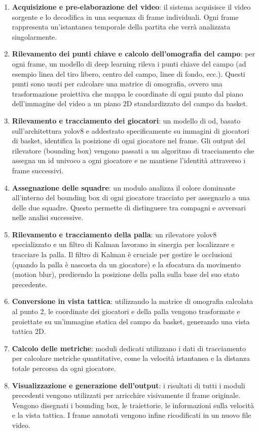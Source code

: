 \documentclass[12pt,a4paper,openright,twoside]{book}
\begin{document}
\begin{enumerate}
  \item \textbf{Acquisizione e pre-elaborazione del video}: il 
  sistema acquisisce il video sorgente e lo decodifica in una 
  sequenza di frame individuali. Ogni frame rappresenta 
  un'istantanea temporale della partita che verrà analizzata 
  singolarmente.
  \item \textbf{Rilevamento dei punti chiave e calcolo dell'omografia del campo}: 
  per ogni frame, un modello di deep learning rileva i punti 
  chiave del campo (ad esempio linea del tiro libero, centro 
  del campo, linee di fondo, ecc.). Questi punti sono usati 
  per calcolare una matrice di omografia, ovvero una 
  trasformazione proiettiva che mappa le coordinate di ogni 
  punto dal piano dell'immagine del video a un piano 2D 
  standardizzato del campo da basket.
  \item \textbf{Rilevamento e tracciamento dei giocatori}: 
  un modello di \ac{od}, basato sull'architettura 
  \ac{yolo}v8 e addestrato specificamente su immagini 
  di giocatori di basket, identifica la posizione di 
  ogni giocatore nel frame. Gli output del rilevatore 
  (bounding box) vengono passati a un algoritmo di 
  tracciamento che assegna un \ac{id} univoco a ogni 
  giocatore e ne mantiene l'identità attraverso i 
  frame successivi.
  \item \textbf{Assegnazione delle squadre}: un modulo analizza 
  il colore dominante all'interno del bounding box di ogni 
  giocatore tracciato per assegnarlo a una delle due squadre. 
  Questo permette di distinguere tra compagni e avversari 
  nelle analisi successive.
  \item \textbf{Rilevamento e tracciamento della palla}: un 
  rilevatore \ac{yolo}v8 specializzato e un filtro di Kalman 
  lavorano in sinergia per localizzare e tracciare la palla. 
  Il filtro di Kalman è cruciale per gestire le occlusioni 
  (quando la palla è nascosta da un giocatore) e la 
  sfocatura da movimento (motion blur), predicendo la 
  posizione della palla sulla base del suo stato precedente.
  \item \textbf{Conversione in vista tattica}: utilizzando 
  la matrice di omografia calcolata al punto 2, le coordinate 
  dei giocatori e della palla vengono trasformate e proiettate 
  su un'immagine statica del campo da basket, generando una 
  vista tattica 2D.
  \item \textbf{Calcolo delle metriche}: moduli dedicati 
  utilizzano i dati di tracciamento per calcolare metriche 
  quantitative, come la velocità istantanea e la distanza 
  totale percorsa da ogni giocatore.
  \item \textbf{Visualizzazione e generazione dell'output}: 
  i risultati di tutti i moduli precedenti vengono utilizzati 
  per arricchire visivamente il frame originale. 
  Vengono disegnati i bounding box, le traiettorie, le 
  informazioni sulla velocità e la vista tattica. 
  I frame annotati vengono infine ricodificati in un nuovo file video.
\end{enumerate}
\end{document}
